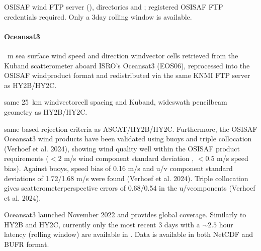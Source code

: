 \documentclass[a4paper,10pt,english]{sphinxmanual}
\begin{document}
\sphinxAtStartPar
{}

\sphinxAtStartPar
OSI\sphinxhyphen{}SAF wind FTP server (), directories  and ; registered OSI\sphinxhyphen{}SAF FTP credentials required. Only a 3\sphinxhyphen{}day rolling window is available.


\paragraph{Oceansat\sphinxhyphen{}3}
\label{\detokenize{05_reference_datasets:oceansat-3}}
\sphinxAtStartPar
{}

 m sea surface wind speed and direction wind\sphinxhyphen{}vector cells retrieved from the Ku\sphinxhyphen{}band scatterometer aboard ISRO’s Oceansat\sphinxhyphen{}3 (EOS\sphinxhyphen{}06), reprocessed into the OSI\sphinxhyphen{}SAF wind\sphinxhyphen{}product format and redistributed via the same KNMI FTP server as HY\sphinxhyphen{}2B/HY\sphinxhyphen{}2C.

\sphinxAtStartPar
{}

\sphinxAtStartPar
same 25 km wind\sphinxhyphen{}vector\sphinxhyphen{}cell spacing and Ku\sphinxhyphen{}band, wide\sphinxhyphen{}swath pencil\sphinxhyphen{}beam geometry as HY\sphinxhyphen{}2B/HY\sphinxhyphen{}2C.

\sphinxAtStartPar
{}

\sphinxAtStartPar
same \sphinxhyphen{}based rejection criteria as ASCAT/HY\sphinxhyphen{}2B/HY\sphinxhyphen{}2C. Furthermore, the OSI\sphinxhyphen{}SAF Oceansat\sphinxhyphen{}3 wind products have been validated using buoys and triple collocation (Verhoef et al. 2024), showing wind quality well within the OSI\sphinxhyphen{}SAF product requirements (\(<2\) m/s wind component standard deviation , \(<0.5\) m/s speed bias). Against buoys, speed bias of \sphinxhyphen{}0.16 m/s and u/v component standard deviations of 1.72/1.68 m/s were found (Verhoef et al. 2024). Triple collocation gives scatterometer\sphinxhyphen{}perspective errors of 0.68/0.54 in the u\sphinxhyphen{}/v\sphinxhyphen{}components (Verhoef et al. 2024).

\sphinxAtStartPar
{}

\sphinxAtStartPar
Oceansat\sphinxhyphen{}3 launched November 2022 and provides global coverage. Similarly to HY\sphinxhyphen{}2B and HY\sphinxhyphen{}2C, currently only the most recent 3 days with a \(\sim2.5\) hour latency (rolling window) are available in . Data is available in both NetCDF and BUFR format.
\end{document}
